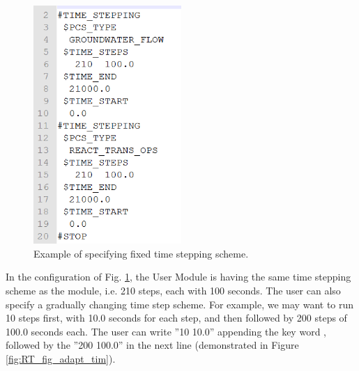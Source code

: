 \begin{figure}
\includegraphics[width=0.5\textwidth]{RT/figs/RT_fig_fixed_tim}
\caption{Example of specifying fixed time stepping scheme. }
\label{fig:RT_fig_fixed_tim}
\end{figure}

In the configuration of Fig. \ref{fig:RT_fig_fixed_tim}, the User Module  is having the same time stepping scheme as the  module, i.e. 210 steps, each with 100 seconds. The user can also specify a gradually changing time step scheme. For example, we may want to run 10 steps first, with 10.0 seconds for each step, and then followed by 200 steps of 100.0 seconds each. The user can write ''10   10.0'' appending the key word , followed by the ''200 100.0'' in the next line (demonstrated in Figure \ref{fig:RT_fig_adapt_tim}). 

